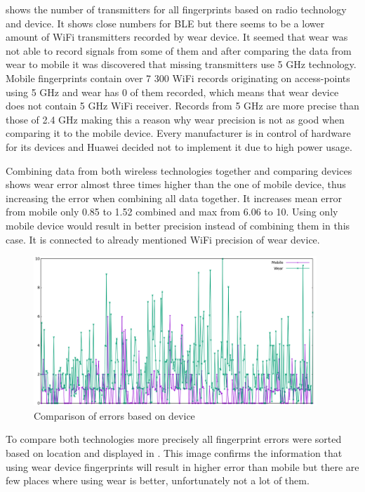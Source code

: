  shows the number of transmitters for all fingerprints based on radio technology and device. It shows close numbers for BLE but there seems to be a lower amount of WiFi transmitters recorded by wear device. It seemed that wear was not able to record signals from some of them and after comparing the data from wear to mobile it was discovered that missing transmitters use 5 GHz technology. Mobile fingerprints contain over 7 300 WiFi records originating on access-points using 5 GHz and wear has 0 of them recorded, which means that wear device does not contain 5 GHz WiFi receiver. Records from 5 GHz are more precise than those of 2.4 GHz making this a reason why wear precision is not as good when comparing it to the mobile device. Every manufacturer is in control of hardware for its devices and Huawei decided not to implement it due to high power usage.

Combining data from both wireless technologies together and comparing devices shows wear error almost three times higher than the one of mobile device, thus increasing the error when combining all data together. It increases mean error from mobile only 0.85 to 1.52 combined and max from 6.06 to 10. Using only mobile device would result in better precision instead of combining them in this case. It is connected to already mentioned WiFi precision of wear device.

\begin{figure}[h!]
	\begin{centering}
		\includegraphics[width=0.95\textwidth]{img/wknn_errors_mobile_phone}
		\par\end{centering}
	\caption{Comparison of errors based on device}
	\label{fig06c06}
\end{figure}

To compare both technologies more precisely all fingerprint errors were sorted based on location and displayed in . This image confirms the information that using wear device fingerprints will result in higher error than mobile but there are few places where using wear is better, unfortunately not a lot of them. 

